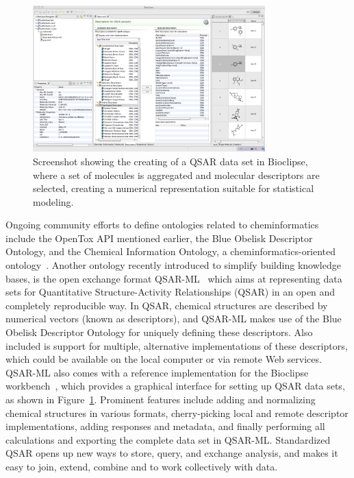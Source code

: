 \documentclass[11pt]{book}
\begin{document}
\begin{figure}[bt]
\begin{center}
\includegraphics[width=0.8\textwidth]{graphics/qsar-collab.png}
\end{center}
\caption{Screenshot showing the creating of a QSAR data set in Bioclipse,
where a set of molecules is aggregated and molecular descriptors are
selected, creating a numerical representation suitable for statistical
modeling.}
\label{fig:qsarml}
\end{figure}

Ongoing community efforts to define ontologies related to cheminformatics include
the OpenTox API mentioned earlier, the Blue Obelisk Descriptor Ontology, and the
Chemical Information Ontology, a cheminformatics-oriented ontology~\cite{url:cheminf}. 
Another ontology recently introduced to simplify building knowledge bases, is
the open exchange format QSAR-ML~\cite{Spjuth:2010fk} which aims at representing data sets
for Quantitative Structure-Activity Relationships (QSAR) in an open and completely
reproducible way. In QSAR, chemical structures are described by numerical vectors
(known as descriptors), and QSAR-ML makes use of the Blue Obelisk Descriptor Ontology for
uniquely defining these descriptors. Also included is support for multiple, alternative
implementations of these descriptors, which could be available on the local computer
or via remote Web services. QSAR-ML also comes with a reference implementation for
the Bioclipse workbench~\cite{Spjuth2009,Spjuth2007}, which provides a graphical
interface for setting up QSAR data sets, as shown in Figure~\ref{fig:qsarml}.
Prominent features include adding and
normalizing chemical structures in various formats, cherry-picking local and
remote descriptor implementations, adding responses and metadata, and finally
performing all calculations and exporting the complete data set in QSAR-ML.
Standardized QSAR opens up new ways to store, query, and exchange analysis,
and makes it easy to join, extend, combine and to work collectively with data.
\end{document}
